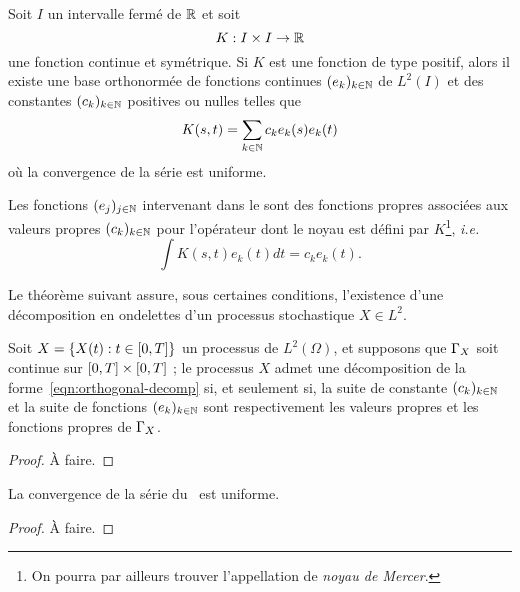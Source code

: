 \begin{theoreme}
  \label{thm:mercers-theorem}
  Soit $I$ un intervalle fermé de $\mathbb{R}$ et soit
  \[ K : I\times I\to \mathbb{R} \] une fonction continue et symétrique. Si
  $K$ est une fonction de type positif, alors il existe une base
  orthonormée de fonctions continues $(e_k)_{k\in\mathbb{N}}$ de $L^2(I)$ et
  des constantes $(c_k)_{k\in\mathbb{N}}$ positives ou nulles telles que
  \begin{equation}
    K(s,t) = \sum_{k\in\mathbb{N}} c_k e_k(s) e_k(t)
  \end{equation}
  où la convergence de la série est uniforme.
\end{theoreme}

\begin{remarque}
  Les fonctions $(e_j)_{j\in\mathbb{N}}$ intervenant dans le
   sont des \og fonctions propres\fg{}
  associées aux \og valeurs propres\fg{} $(c_k)_{k\in\mathbb{N}}$ pour
  l'opérateur dont le noyau est défini par $K$\footnote{On pourra par
    ailleurs trouver l'appellation de \emph{noyau de Mercer}.},
  \emph{i.e.}
  \begin{equation*}
    \int K(s,t) e_k(t) dt = c_k e_k(t).
  \end{equation*}
\end{remarque}

Le théorème suivant assure, sous certaines conditions, l'existence
d'une \og décomposition en ondelettes\fg{} d'un processus stochastique
$X\in L^2$.

\begin{theoreme}
  \label{thm:orthogonal-decomp}
  Soit $X = \{X(t) : t\in\left[0,T\right]\}$ un processus de $L^2(\Omega)$,
  et supposons que $\Gamma_X$ soit continue sur
  $\left[0,T\right]\times\left[0,T\right]$ ; le processus $X$ admet une
  décomposition de la forme~\ref{eqn:orthogonal-decomp} si, et
  seulement si, la suite de constante $(c_k)_{k\in\mathbb{N}}$ et la suite de
  fonctions $(e_k)_{k\in\mathbb{N}}$ sont respectivement les valeurs propres
  et les fonctions propres de $\Gamma_X$.
\end{theoreme}
\begin{alert}
  \begin{proof}
    À faire.
  \end{proof}
\end{alert}

\begin{remarque}
  La convergence de la série du~ est uniforme.
\end{remarque}
\begin{alert}
  \begin{proof}
    À faire.
  \end{proof}
\end{alert}

